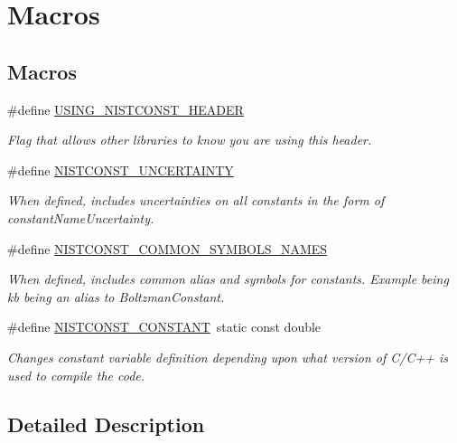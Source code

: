 \hypertarget{group___n_i_s_t_const-_macros}{}\section{Macros}
\label{group___n_i_s_t_const-_macros}
\subsection*{Macros}
\begin{DoxyCompactItemize}
\item 
\mbox{\label{group___n_i_s_t_const-_macros_gae47d8d4acede461bdd46c016ee7e8abd}} 
\#define \mbox{\hyperlink{group___n_i_s_t_const-_macros_gae47d8d4acede461bdd46c016ee7e8abd}{U\+S\+I\+N\+G\+\_\+\+N\+I\+S\+T\+C\+O\+N\+S\+T\+\_\+\+H\+E\+A\+D\+ER}}
\begin{DoxyCompactList}\small\item\em Flag that allows other libraries to know you are using this header. \end{DoxyCompactList}\item 
\mbox{\label{group___n_i_s_t_const-_macros_ga7bccf2d5c771c483afd5a97428e72011}} 
\#define \mbox{\hyperlink{group___n_i_s_t_const-_macros_ga7bccf2d5c771c483afd5a97428e72011}{N\+I\+S\+T\+C\+O\+N\+S\+T\+\_\+\+U\+N\+C\+E\+R\+T\+A\+I\+N\+TY}}
\begin{DoxyCompactList}\small\item\em When defined, includes uncertainties on all constants in the form of constant\+Name\+Uncertainty. \end{DoxyCompactList}\item 
\mbox{\label{group___n_i_s_t_const-_macros_gab42ba0c0e1e16be114b35864944215ae}} 
\#define \mbox{\hyperlink{group___n_i_s_t_const-_macros_gab42ba0c0e1e16be114b35864944215ae}{N\+I\+S\+T\+C\+O\+N\+S\+T\+\_\+\+C\+O\+M\+M\+O\+N\+\_\+\+S\+Y\+M\+B\+O\+L\+S\+\_\+\+N\+A\+M\+ES}}
\begin{DoxyCompactList}\small\item\em When defined, includes common alias and symbols for constants. Example being kb being an alias to Boltzman\+Constant. \end{DoxyCompactList}\item 
\mbox{\label{group___n_i_s_t_const-_macros_ga2b0fc1d7452373f816175dd86ce26729}} 
\#define \mbox{\hyperlink{group___n_i_s_t_const-_macros_ga2b0fc1d7452373f816175dd86ce26729}{N\+I\+S\+T\+C\+O\+N\+S\+T\+\_\+\+C\+O\+N\+S\+T\+A\+NT}}~static const double
\begin{DoxyCompactList}\small\item\em Changes constant variable definition depending upon what version of C/\+C++ is used to compile the code. \end{DoxyCompactList}\end{DoxyCompactItemize}


\subsection{Detailed Description}
